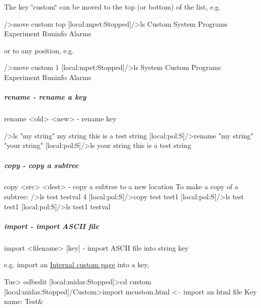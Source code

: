 The key \char`\"{}custom\char`\"{} can be moved to the top (or bottom) of the list, e.g. 
\begin{DoxyCode}
/>move custom top
[local:mpet:Stopped]/>ls
Custom
System
Programs
Experiment
Runinfo
Alarms
\end{DoxyCode}


or to any position, e.g. 
\begin{DoxyCode}
/>move custom 1
[local:mpet:Stopped]/>ls
System
Custom
Programs
Experiment
Runinfo
Alarms
\end{DoxyCode}




\hypertarget{RC_odbedit_examples_RC_odbedit_rename}{}\subparagraph{rename -\/ rename a key}\label{RC_odbedit_examples_RC_odbedit_rename}

\begin{DoxyCode}
rename <old> <new>      - rename key
\end{DoxyCode}
 \par
 
\begin{DoxyCode}
/>ls "my string"
my string                       this is a test string
[local:pol:S]/>rename "my string" "your string"
[local:pol:S]/>ls
your string                       this is a test string
\end{DoxyCode}




\hypertarget{RC_odbedit_examples_RC_odbedit_copy}{}\subparagraph{copy -\/ copy a subtree}\label{RC_odbedit_examples_RC_odbedit_copy}

\begin{DoxyCode}
copy <src> <dest>       - copy a subtree to a new location
\code
To make a copy of a subtree:
/>ls test
testval                         4
[local:pol:S]/>copy test test1
[local:pol:S]/>ls
test
test1
[local:pol:S]/>ls test1
testval       
\end{DoxyCode}




\hypertarget{RC_odbedit_examples_RC_odbedit_import}{}\subparagraph{import -\/  import ASCII file}\label{RC_odbedit_examples_RC_odbedit_import}

\begin{DoxyCode}
import  <filename> [key]    - import ASCII file into string key 
\end{DoxyCode}


e.g. import an \hyperlink{RC_mhttpd_Internal}{Internal custom page} into a key, 
\begin{DoxyCode}
Tue> odbedit
[local:midas:Stopped]>cd custom
[local:midas:Stopped]/Custom>import mcustom.html   <-- import an html file
  Key name: Test&  
\end{DoxyCode}




